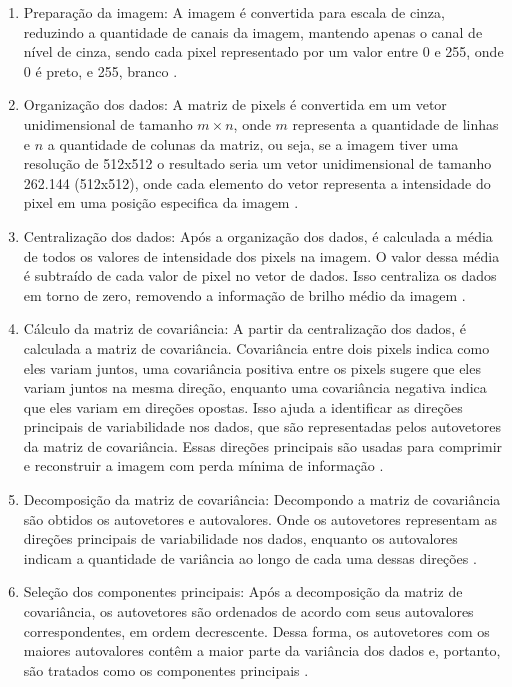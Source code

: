 \begin{enumerate}
    \item Preparação da imagem:
    A imagem é convertida para escala de cinza, reduzindo a quantidade de canais da imagem, mantendo apenas o canal de nível de cinza, sendo cada pixel representado por um valor entre 0 e 255, onde 0 é preto, e 255, branco \cite{multivariateAnalysis}.

    \item Organização dos dados:
    A matriz de pixels é convertida em um vetor unidimensional de tamanho $m \times n$, onde $m$ representa a quantidade  de linhas e $n$ a quantidade de colunas da matriz, ou seja, se a imagem tiver uma resolução de 512x512 o resultado seria um vetor unidimensional de tamanho 262.144 (512x512), onde cada elemento do vetor representa a intensidade do pixel em uma posição especifica da imagem \cite{multivariateAnalysis}.

    \item Centralização dos dados:
    Após a organização dos dados, é calculada a média de todos  os valores de intensidade dos pixels na imagem. O valor dessa média é subtraído de cada valor de pixel no vetor de dados. Isso centraliza  os dados em torno de zero, removendo a informação de brilho médio da imagem \cite{multivariateAnalysis}.

    \item Cálculo da matriz de covariância:
    A partir da centralização dos dados, é calculada a matriz de covariância. Covariância entre dois pixels indica como eles variam juntos, uma covariância positiva entre os pixels sugere que eles variam juntos na mesma direção, enquanto uma covariância negativa indica que eles variam em direções opostas. Isso ajuda a identificar as direções principais de variabilidade nos dados, que são representadas pelos autovetores da matriz de covariância. Essas direções principais são usadas para comprimir e reconstruir a imagem com perda mínima de informação \cite{multivariateAnalysis}.

    \item Decomposição da matriz  de covariância:
    Decompondo a matriz de covariância são obtidos os autovetores e autovalores. Onde os autovetores representam as direções principais de variabilidade nos dados, enquanto os autovalores indicam a quantidade de variância ao longo de cada uma dessas direções \cite{multivariateAnalysis}.

    \item Seleção dos componentes principais:
    Após a decomposição da matriz de covariância, os autovetores são ordenados de acordo com seus autovalores correspondentes, em ordem decrescente. Dessa forma, os autovetores com os maiores autovalores contêm a maior parte da variância dos dados e, portanto, são tratados como os componentes principais \cite{multivariateAnalysis}.


\end{enumerate}
